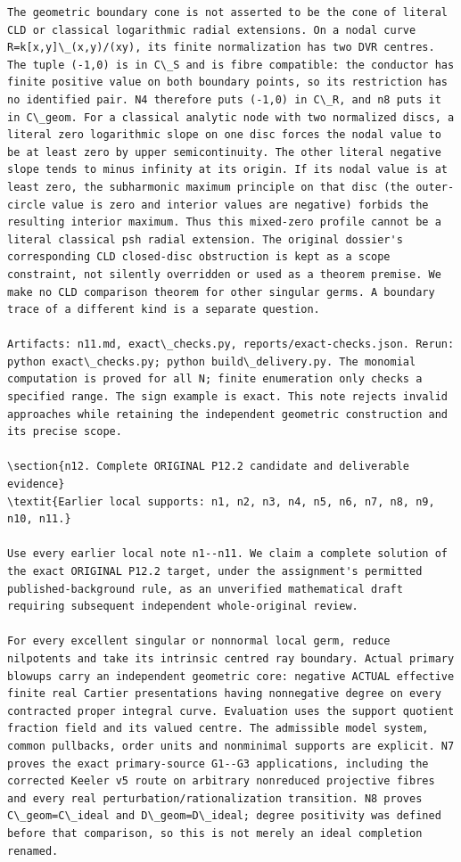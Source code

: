 \documentclass[
]{article}
\begin{document}
\begin{verbatim}
The geometric boundary cone is not asserted to be the cone of literal CLD or classical logarithmic radial extensions. On a nodal curve R=k[x,y]\_(x,y)/(xy), its finite normalization has two DVR centres. The tuple (-1,0) is in C\_S and is fibre compatible: the conductor has finite positive value on both boundary points, so its restriction has no identified pair. N4 therefore puts (-1,0) in C\_R, and n8 puts it in C\_geom. For a classical analytic node with two normalized discs, a literal zero logarithmic slope on one disc forces the nodal value to be at least zero by upper semicontinuity. The other literal negative slope tends to minus infinity at its origin. If its nodal value is at least zero, the subharmonic maximum principle on that disc (the outer-circle value is zero and interior values are negative) forbids the resulting interior maximum. Thus this mixed-zero profile cannot be a literal classical psh radial extension. The original dossier's corresponding CLD closed-disc obstruction is kept as a scope constraint, not silently overridden or used as a theorem premise. We make no CLD comparison theorem for other singular germs. A boundary trace of a different kind is a separate question.

Artifacts: n11.md, exact\_checks.py, reports/exact-checks.json. Rerun: python exact\_checks.py; python build\_delivery.py. The monomial computation is proved for all N; finite enumeration only checks a specified range. The sign example is exact. This note rejects invalid approaches while retaining the independent geometric construction and its precise scope.

\section{n12. Complete ORIGINAL P12.2 candidate and deliverable evidence}
\textit{Earlier local supports: n1, n2, n3, n4, n5, n6, n7, n8, n9, n10, n11.}

Use every earlier local note n1--n11. We claim a complete solution of the exact ORIGINAL P12.2 target, under the assignment's permitted published-background rule, as an unverified mathematical draft requiring subsequent independent whole-original review.

For every excellent singular or nonnormal local germ, reduce nilpotents and take its intrinsic centred ray boundary. Actual primary blowups carry an independent geometric core: negative ACTUAL effective finite real Cartier presentations having nonnegative degree on every contracted proper integral curve. Evaluation uses the support quotient fraction field and its valued centre. The admissible model system, common pullbacks, order units and nonminimal supports are explicit. N7 proves the exact primary-source G1--G3 applications, including the corrected Keeler v5 route on arbitrary nonreduced projective fibres and every real perturbation/rationalization transition. N8 proves C\_geom=C\_ideal and D\_geom=D\_ideal; degree positivity was defined before that comparison, so this is not merely an ideal completion renamed.


\end{verbatim}
\end{document}
